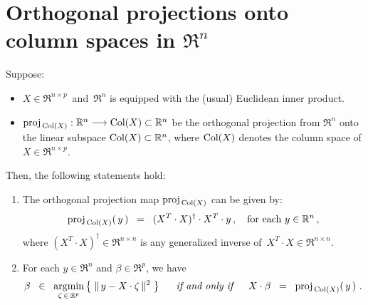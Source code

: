

\section{Orthogonal projections onto column spaces in $\Re^{n}$}
\setcounter{theorem}{0}
\setcounter{equation}{0}

\renewcommand{\theenumi}{\roman{enumi}}
\renewcommand{\labelenumi}{\textnormal{(\theenumi)}$\;\;$}


\begin{proposition}
\mbox{}
\vskip 0.1cm
\noindent
Suppose:
\begin{itemize}
\item
	$X \in \Re^{n \times p}$\, and \,$\Re^{n}$ is equipped with the (usual) Euclidean inner product.
\item
	$\textnormal{proj}_{\,\textnormal{Col}(X)} : \mathbb{R}^{n} \longrightarrow \textnormal{Col}(X) \subset \mathbb{R}^{n}$
	be the orthogonal projection from $\Re^{n}$ onto the linear subspace $\textnormal{Col}(X) \subset \mathbb{R}^{n}$,
	where $\textnormal{Col}(X)$ denotes the column space of $X \in \Re^{n \times p}$.
\end{itemize}
Then, the following statements hold:
\begin{enumerate}
\item
	The orthogonal projection map $\textnormal{proj}_{\,\textnormal{Col}(X)}$ can be given by:
	\begin{equation*}
	\textnormal{proj}_{\,\textnormal{Col}(X)}(\,y\,) \;\; = \;\; (X^{T}\cdot X)^{\dagger} \cdot X^{T} \cdot y\,,
	\quad
	\textnormal{for each $y \in \mathbb{R}^{n}$}\,,
	\end{equation*}
	where $(X^{T}\cdot X)^{\dagger} \in \Re^{n \times n}$ is any generalized inverse of
	\,$X^{T} \cdot X \in \Re^{n \times n}$.
\item
	For each $y \in \Re^{n}$ and $\beta \in \Re^{p}$, we have
	\begin{equation*}
	\beta \;\;\in\;\; \underset{\zeta\,\in\,\mathbb{R}^{p}}{\textnormal{argmin}}\left\{\;\Vert\,y - X \cdot \zeta\,\Vert^{2}\;\right\}
	\quad\;\;\textnormal{\it if and only if}\quad\;\;
	X\cdot\beta \;\; = \;\; \textnormal{proj}_{\,\textnormal{Col}(X)}\!\left(\,y\,\right)\,.
	\end{equation*}
\end{enumerate}
\end{proposition}


